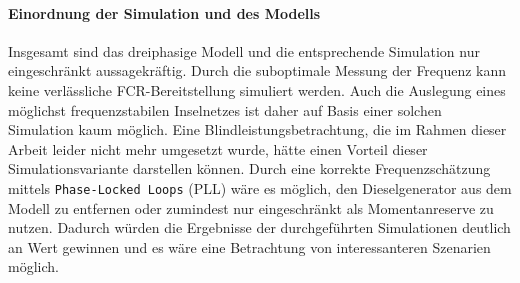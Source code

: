 \paragraph{Einordnung der Simulation und des Modells}
Insgesamt sind das dreiphasige Modell und die entsprechende Simulation nur eingeschränkt aussagekräftig.
Durch die suboptimale Messung der Frequenz kann keine verlässliche FCR-Bereitstellung simuliert werden.
Auch die Auslegung eines möglichst frequenzstabilen Inselnetzes ist daher auf Basis einer solchen Simulation kaum möglich.
Eine Blindleistungsbetrachtung, die im Rahmen dieser Arbeit leider nicht mehr umgesetzt wurde, hätte einen Vorteil
dieser Simulationsvariante darstellen können.
Durch eine korrekte Frequenzschätzung mittels \texttt{Phase-Locked Loops} (PLL) wäre es möglich, den Dieselgenerator
aus dem Modell zu entfernen oder zumindest nur eingeschränkt als Momentanreserve zu nutzen.
Dadurch würden die Ergebnisse der durchgeführten Simulationen deutlich an Wert gewinnen und es wäre eine 
Betrachtung von interessanteren Szenarien möglich.
